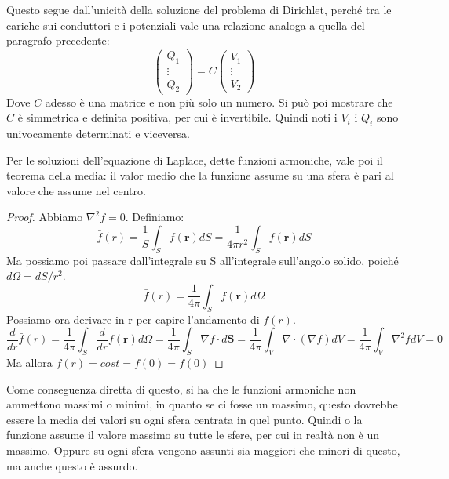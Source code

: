 \documentclass{article}
\newcommand{\mbf}{\mathbf}
\newcommand{\grad}[1][]{\nabla#1}
\renewcommand{\div}[1][]{\nabla#1 \cdot}
\numberwithin{equation}{section}
\begin{document}
Questo segue dall'unicità della soluzione del problema di Dirichlet, perché tra le cariche sui conduttori e i potenziali vale una relazione analoga a quella del paragrafo precedente:
\begin{equation}
    \begin{pmatrix}
        Q_1 \\
        \vdots \\
        Q_2
    \end{pmatrix}
    = C 
    \begin{pmatrix}
        V_1 \\
        \vdots \\
        V_2
    \end{pmatrix}
\end{equation}
Dove $C$ adesso è una matrice e non più solo un numero. Si può poi mostrare che $C$ è simmetrica e definita positiva, per cui è invertibile. Quindi noti i $V_i$ i $Q_i$ sono univocamente determinati e viceversa. 

Per le soluzioni dell'equazione di Laplace, dette funzioni armoniche, vale poi il teorema della media: il valor medio che la funzione assume su una sfera è pari al valore che assume nel centro.
\begin{proof}
    Abbiamo $\nabla^2 f = 0$. Definiamo:
    \begin{equation}
        \bar f (r) = \frac{ 1 }{ S } \int_S f(\mbf r) dS = \frac{ 1 }{ 4 \pi r^2 } \int_S f(\mbf r) dS
    \end{equation}
    Ma possiamo poi passare dall'integrale su S all'integrale sull'angolo solido, poiché $d\Omega = dS/r^2$. 
    \begin{equation}
        \bar f (r) = \frac{ 1 }{ 4 \pi } \int_S f(\mbf r) d\Omega
    \end{equation}
    Possiamo ora derivare in r per capire l'andamento di $\bar f(r)$.
    \begin{equation}
        \frac{ d }{ dr } \bar f (r) 
            = \frac{ 1 }{ 4 \pi } \int_S \frac{ d }{ dr } f(\mbf r) d\Omega 
            = \frac{ 1 }{ 4 \pi } \int_S \grad f \cdot d \mbf S
            = \frac{ 1 }{ 4 \pi } \int_V \div (\grad f) dV
            = \frac{ 1 }{ 4 \pi } \int_V \nabla^2 f dV = 0
    \end{equation}
    Ma allora $\bar f(r) = cost = \bar f(0) = f(0)$
\end{proof}
Come conseguenza diretta di questo, si ha che le funzioni armoniche non ammettono massimi o minimi, in quanto se ci fosse un massimo, questo dovrebbe essere la media dei valori su ogni sfera centrata in quel punto. Quindi o la funzione assume il valore massimo su tutte le sfere, per cui in realtà non è un massimo. Oppure su ogni sfera vengono assunti sia maggiori che minori di questo, ma anche questo è assurdo. 
\end{document}
